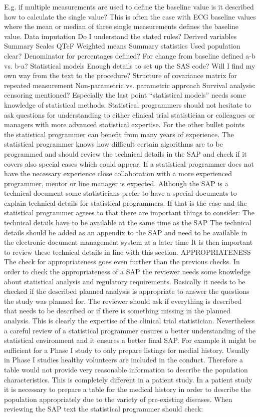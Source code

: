 E.g. if multiple measurements are used to define the baseline value is it described how to calculate the single value? This is often the case with ECG baseline values where the mean or median of three single measurements defines the baseline value.
Data imputation
Do I understand the stated rules?
Derived variables
Summary Scales
QTcF
Weighted means
Summary statistics
Used population clear?
Denominator for percentages defined?
For change from baseline defined a-b vs. b-a?
Statistical models
Enough details to set up the SAS code?
Will I find my own way from the text to the procedure?
Structure of covariance matrix for repeated measurement
Non-parametric vs. parametric approach
Survival analysis: censoring mentioned?
Especially the last point “statistical models” needs some knowledge of statistical methods. Statistical programmers should not hesitate to ask questions for understanding to either clinical trial statistician or colleagues or managers with more advanced statistical expertise. For the other bullet points the statistical programmer can benefit from many years of experience. The statistical programmer knows how difficult certain algorithms are to be programmed and should review the technical details in the SAP and check if it covers also special cases which could appear. If a statistical programmer does not have the necessary experience close collaboration with a more experienced programmer, mentor or line manager is expected.
Although the SAP is a technical document some statisticians prefer to have a special documents to explain technical details for statistical programmers. If that is the case and the statistical programmer agrees to that there are important things to consider:
The technical details have to be available at the same time as the SAP
The technical details should be added as an appendix to the SAP and need to be available in the electronic document management system at a later time
It is then important to review these technical details in line with this section.
APPROPRIATENESS
The check for appropriateness goes even further than the previous checks. In order to check the appropriateness of a SAP the reviewer needs some knowledge about statistical analysis and regulatory requirements. Basically it needs to be checked if the described planned analysis is appropriate to answer the questions the study was planned for. The reviewer should ask if everything is described that needs to be described or if there is something missing in the planned analysis. This is clearly the expertise of the clinical trial statistician. Nevertheless a careful review of a statistical programmer ensures a better understanding of the statistical environment and it ensures a better final SAP. For example it might be sufficient for a Phase I study to only prepare listings for medial history. Usually in Phase I studies healthy volunteers are included in the conduct. Therefore a table would not provide very reasonable information to describe the population characteristics. This is completely different in a patient study. In a patient study it is necessary to prepare a table for the medical history in order to describe the population appropriately due to the variety of pre-existing diseases. When reviewing the SAP text the statistical programmer should check:
